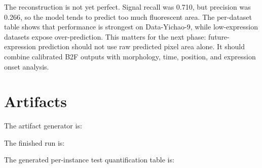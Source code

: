 \documentclass[11pt]{article}
\begin{document}
The reconstruction is not yet perfect. Signal recall was 0.710, but precision was 0.266, so the model tends to predict too much fluorescent area. The per-dataset table shows that performance is strongest on Data-Yichao-9, while low-expression datasets expose over-prediction. This matters for the next phase: future-expression prediction should not use raw predicted pixel area alone. It should combine calibrated B2F outputs with morphology, time, position, and expression onset analysis.

\section*{Artifacts}

The artifact generator is:
\begin{center}
\small{}
\end{center}

The finished run is:
\begin{center}
\small{}
\end{center}

The generated per-instance test quantification table is:
\begin{center}
\small{}
\end{center}
\end{document}
